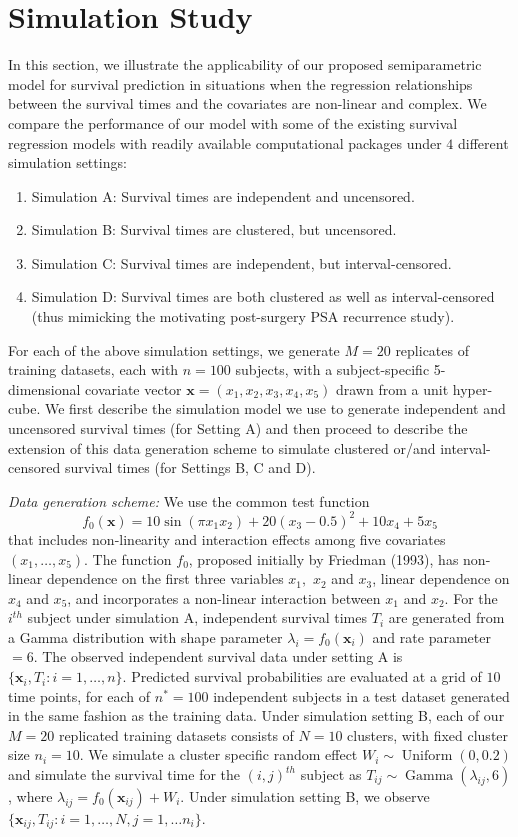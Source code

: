 \documentclass[11pt]{article}
\newcommand{\Gam}{\operatorname{Gamma}}
\newcommand{\Uniform}{\operatorname{Uniform}}
\begin{document}
 \section{Simulation Study}
 \label{s:sbart-simulation}
 In this section, we illustrate the applicability of our proposed semiparametric model for survival prediction in situations when the regression relationships between the survival times and the covariates are non-linear and complex. We compare the performance of our model with some of the existing survival regression models with readily available computational packages under $4$ different simulation settings:
 \begin{enumerate}
     \item Simulation A: Survival times are independent and uncensored.
     \item Simulation B: Survival times are clustered, but uncensored.
     \item Simulation C: Survival times are independent, but interval-censored.
     \item Simulation D: Survival times are both clustered as well as interval-censored (thus mimicking the motivating post-surgery PSA recurrence study). 
 \end{enumerate}
For each of the above simulation settings, we generate $M=20$ replicates of training datasets, each with $n=100$ subjects, with a subject-specific 5-dimensional  covariate vector $\mathbf{x} = (x_1, x_2, x_3, x_4, x_5)$ drawn from a unit hyper-cube. We first describe the simulation model we use to generate independent and uncensored survival times (for Setting A) and then proceed to describe the extension of this data generation scheme to simulate clustered or/and interval-censored survival times (for Settings B, C and D).


 \textit{Data generation scheme:} We use the common test function
 $$f_0(\mathbf{x}) = 10\sin(\pi x_1 x_2) + 20(x_3 - 0.5)^2 + 10x_4 + 5x_5$$   
 that includes non-linearity and interaction effects among five covariates $(x_1, \ldots, x_5)$. The function $f_0$, proposed initially by Friedman (1993), has non-linear dependence on the first three variables $x_1,$ $x_2$ and $x_3$, linear dependence on $x_4$ and $x_5$, and incorporates a non-linear interaction between $x_1$ and $x_2$. For the $i^{th}$ subject under simulation A, independent survival times $T_i$ are generated from a Gamma distribution with shape parameter $\lambda_i = f_0(\mathbf{x}_i)$ and rate parameter $= 6.$ The observed independent survival data under setting A is $\{\mathbf{x}_i, T_i: i=1, \dots, n\}.$ Predicted survival probabilities are evaluated at a grid of $10$ time points, for each of $n^{*} = 100$ independent subjects in a test dataset generated in the same fashion as the training data. Under simulation setting B, each of our $M=20$ replicated training datasets consists of $N=10$ clusters, with fixed cluster size $n_i = 10.$ We simulate a cluster specific random effect $W_i \sim \Uniform(0,0.2)$ and simulate the survival time for the $(i,j)^{th}$ subject as $T_{ij} \sim \Gam(\lambda_{ij}, 6)$, where $\lambda_{ij} = f_0(\mathbf x_{ij}) + W_i$. Under simulation setting B, we observe $\{\mathbf{x}_{ij}, T_{ij}: i=1, \dots, N, j=1, \dots n_i\}.$
 
\end{document}
